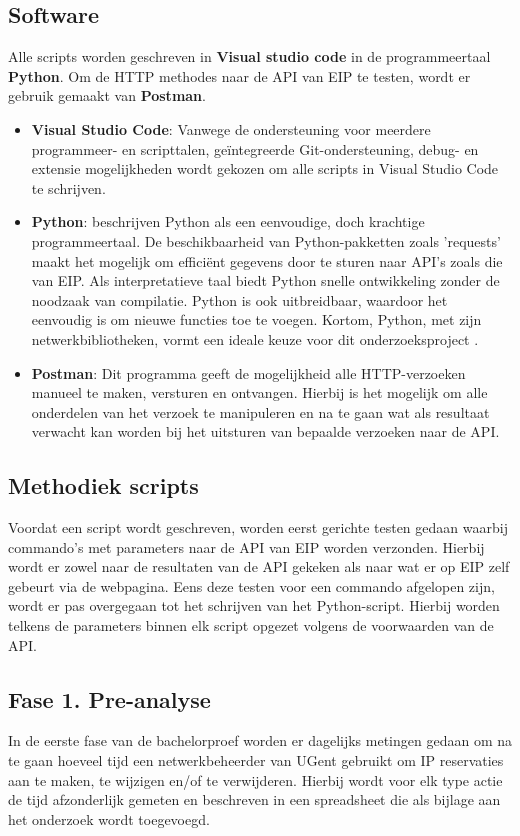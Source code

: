 \subsection{Software}
Alle scripts worden geschreven in \textbf{Visual studio code} in de programmeertaal \textbf{Python}.
Om de HTTP methodes naar de API van EIP te testen, wordt er gebruik gemaakt van \textbf{Postman}.
\begin{itemize}
    \item \textbf{Visual Studio Code}: Vanwege de ondersteuning voor meerdere programmeer- en scripttalen, geïntegreerde Git-ondersteuning, debug- en extensie mogelijkheden wordt gekozen om alle scripts in Visual Studio Code te schrijven.
    \item \textbf{Python}: \textcite{VanRossum2011} beschrijven Python als een eenvoudige, doch krachtige programmeertaal. De beschikbaarheid van Python-pakketten zoals ’requests’ maakt het mogelijk om efficiënt gegevens door te sturen naar API’s zoals die van EIP. Als interpretatieve taal biedt Python snelle ontwikkeling zonder de noodzaak van compilatie. Python is ook uitbreidbaar, waardoor het eenvoudig is om nieuwe functies toe te voegen. Kortom, Python, met zijn netwerkbibliotheken, vormt een ideale keuze voor dit onderzoeksproject \autocite{VanRossum2011}.
    \item \textbf{Postman}: Dit programma geeft de mogelijkheid alle HTTP-verzoeken manueel te maken, versturen en ontvangen. Hierbij is het mogelijk om alle onderdelen van het verzoek te manipuleren en na te gaan wat als resultaat verwacht kan worden bij het uitsturen van bepaalde verzoeken naar de API.
\end{itemize}

\subsection{Methodiek scripts}
Voordat een script wordt geschreven, worden eerst gerichte testen gedaan waarbij commando's met parameters naar de API van EIP worden verzonden. Hierbij wordt er zowel naar de resultaten van de API gekeken als naar wat er op EIP zelf gebeurt via de webpagina. Eens deze testen voor een commando afgelopen zijn, wordt er pas overgegaan tot het schrijven van het Python-script. Hierbij worden telkens de parameters binnen elk script opgezet volgens de voorwaarden van de API.

\subsection{Fase 1. Pre-analyse}
In de eerste fase van de bachelorproef worden er dagelijks metingen gedaan om na te gaan hoeveel tijd een netwerkbeheerder van UGent gebruikt om IP reservaties aan te maken, te wijzigen en/of te verwijderen. Hierbij wordt voor elk type actie de tijd afzonderlijk gemeten en beschreven in een spreadsheet die als bijlage aan het onderzoek wordt toegevoegd.

